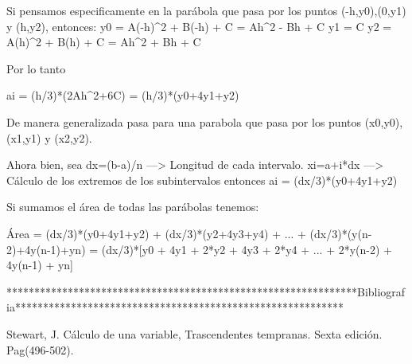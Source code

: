 Si pensamos especificamente en la parábola que pasa por los puntos (-h,y0),(0,y1) y (h,y2), entonces:
y0 = A(-h)^2 + B(-h) + C = Ah^2 - Bh + C
y1 = C
y2 = A(h)^2 + B(h) + C = Ah^2 + Bh + C

Por lo tanto

ai = (h/3)*(2Ah^2+6C) = (h/3)*(y0+4y1+y2)

De manera generalizada pasa para una parabola que pasa por los puntos (x0,y0),(x1,y1) y (x2,y2).

Ahora bien, sea
dx=(b-a)/n ---> Longitud de cada intervalo.
xi=a+i*dx ---> Cálculo de los extremos de los subintervalos
entonces ai = (dx/3)*(y0+4y1+y2)

Si sumamos el área de todas las parábolas tenemos:

Área = (dx/3)*(y0+4y1+y2) + (dx/3)*(y2+4y3+y4) + ... + (dx/3)*(y(n-2)+4y(n-1)+yn)
     = (dx/3)*[y0 + 4y1 + 2*y2 + 4y3 + 2*y4 + ... + 2*y(n-2) + 4y(n-1) + yn]

***************************************************************Bibliografia***********************************************************

Stewart, J. Cálculo de una variable, Trascendentes tempranas. Sexta edición. Pag(496-502).






